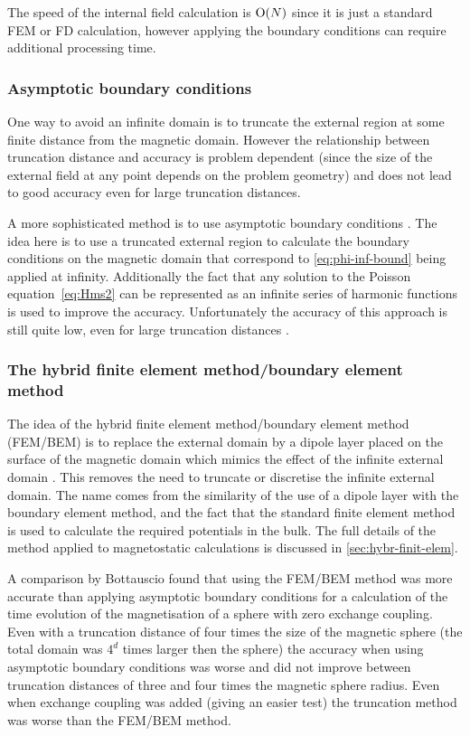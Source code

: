 The speed of the internal field calculation is $\text{O}{\left( N \right)}$ since it is just a standard FEM or FD calculation, however applying the boundary conditions can require additional processing time.


\subsubsection{Asymptotic boundary conditions}
\label{sec:asymptot-bcs}

One way to avoid an infinite domain is to truncate the external region at some finite distance from the magnetic domain.
However the relationship between truncation distance and accuracy is problem dependent (since the size of the external field at any point depends on the problem geometry) and does not lead to good accuracy even for large truncation distances.

A more sophisticated method is to use asymptotic boundary conditions \cite{Yang1997}. The idea here is to use a truncated external region to calculate the boundary conditions on the magnetic domain that correspond to \cref{eq:phi-inf-bound} being applied at infinity.
Additionally the fact that any solution to the Poisson equation~\cref{eq:Hms2} can be represented as an infinite series of harmonic functions is used to improve the accuracy.
Unfortunately the accuracy of this approach is still quite low, even for large truncation distances \cite{Bottauscio2008}.


\subsubsection{The hybrid finite element method/boundary element method}
\label{sec:bound-elem-meth}

The idea of the hybrid finite element method/boundary element method (FEM/BEM) is to replace the external domain by a dipole layer placed on the surface of the magnetic domain which mimics the effect of the infinite external domain \cite{Fredkin1990}.
This removes the need to truncate or discretise the infinite external domain.
The name comes from the similarity of the use of a dipole layer with the boundary element method, and the fact that the standard finite element method is used to calculate the required potentials in the bulk.
The full details of the method applied to magnetostatic calculations is discussed in \cref{sec:hybr-finit-elem}.

A comparison by Bottauscio\cite{Bottauscio2008} found that using the FEM/BEM method was more accurate than applying asymptotic boundary conditions for a calculation of the time evolution of the magnetisation of a sphere with zero exchange coupling.
Even with a truncation distance of four times the size of the magnetic sphere (the total domain was $4^d$ times larger then the sphere) the accuracy when using asymptotic boundary conditions was worse and did not improve between truncation distances of three and four times the magnetic sphere radius.
Even when exchange coupling was added (giving an easier test) the truncation method was worse than the FEM/BEM method.

